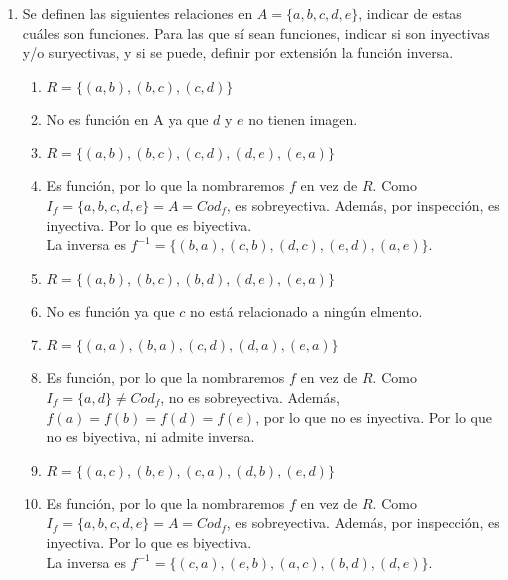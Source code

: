 \documentclass[a4paper]{article}
\newcommand{\answer}{\item[**]}
\newcommand{\exercise}{\item}
\begin{document}
\begin{enumerate}
\begin{enumerate} [label=(\alph*)]
		\item Otro mayorista vende las galletitas sueltas por peso y no por paquete. Ofrece lo siguiente: hasta 3kg se vende a 30 pesos el kilo; más de 3kg y hasta 6kg se vende a 25 pesos el kilo; más de 6kg se vende a 20 pesos el kilo. Por ejemplo, si una persona compra 7kg y paga 7 x 20 = 140 pesos. Debido a que el proveedor cobra digitalmente, se puede pagar el monto exacto sin redondear.
		\answer $f: \mathbb{R}^{+}_{0} \to \mathbb{R}^{+}_{0} ~|~ f(x)=\left\{\begin{matrix}30x ~~~si~ 0\leq x\leq 3 \\25x ~~~si~ 30 < x\leq 6 \\ 20x ~~~si~ 30 < x~~~~\end{matrix}\right.$

	\end{enumerate}

	\exercise Se definen las siguientes relaciones en $A = \{a, b, c, d, e\}$, indicar de estas cuáles son funciones. Para las que sí sean funciones, indicar si son inyectivas y/o suryectivas, y si se puede, definir por extensión la función inversa.
	\begin{enumerate} [label=(\alph*)]
		\item $R = \{(a,b), (b,c), (c,d)\}$
		\answer No es función en A ya que $d$ y $e$ no tienen imagen.

		\item $R = \{(a,b), (b,c), (c,d), (d,e), (e,a)\}$
		\answer Es función, por lo que la nombraremos $f$ en vez de $R$. Como $I_f=\{a,b,c,d,e\}=A=Cod_f$, es sobreyectiva. Además, por inspección, es inyectiva. Por lo que es biyectiva. \\ La inversa es $f^{-1}=\{(b,a), (c,b), (d,c), (e,d), (a,e)\}$.

		\item $R = \{(a,b), (b,c), (b,d), (d,e), (e,a)\}$
		\answer No es función ya que $c$ no está relacionado a ningún elmento.

		\item $R = \{(a,a), (b,a), (c,d), (d,a), (e,a)\}$
		\answer Es función, por lo que la nombraremos $f$ en vez de $R$. Como $I_f=\{a,d\} \neq Cod_f$, no es sobreyectiva. Además, $f(a)=f(b)=f(d)=f(e)$, por lo que no es inyectiva. Por lo que no es biyectiva, ni admite inversa.

		\item $R = \{(a,c), (b,e), (c,a), (d,b), (e,d)\}$
		\answer Es función, por lo que la nombraremos $f$ en vez de $R$. Como $I_f=\{a,b,c,d,e\}=A=Cod_f$, es sobreyectiva. Además, por inspección, es inyectiva. Por lo que es biyectiva. \\ La inversa es $f^{-1}=\{(c,a), (e,b), (a,c), (b,d), (d,e)\}$.
	\end{enumerate}


\end{enumerate}
\end{document}
